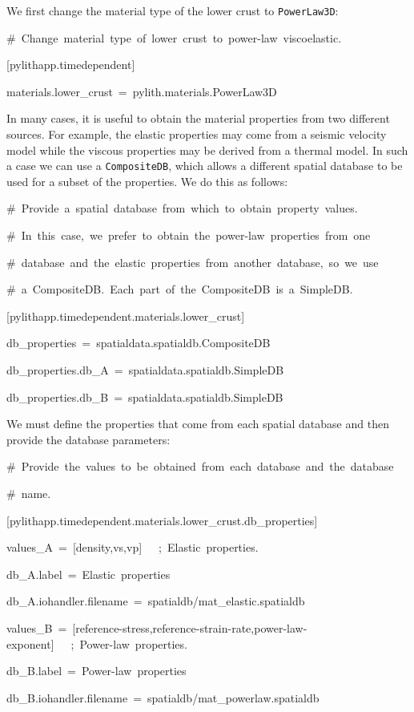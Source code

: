 We first change the material type of the lower crust to \texttt{PowerLaw3D}:
\begin{lyxcode}
\#~Change~material~type~of~lower~crust~to~power-law~viscoelastic.

{[}pylithapp.timedependent{]}

materials.lower\_crust~=~pylith.materials.PowerLaw3D
\end{lyxcode}
In many cases, it is useful to obtain the material properties from
two different sources. For example, the elastic properties may come
from a seismic velocity model while the viscous properties may be
derived from a thermal model. In such a case we can use a \texttt{CompositeDB},
which allows a different spatial database to be used for a subset
of the properties. We do this as follows:
\begin{lyxcode}
\#~Provide~a~spatial~database~from~which~to~obtain~property~values.

\#~In~this~case,~we~prefer~to~obtain~the~power-law~properties~from~one

\#~database~and~the~elastic~properties~from~another~database,~so~we~use

\#~a~CompositeDB.~Each~part~of~the~CompositeDB~is~a~SimpleDB.

{[}pylithapp.timedependent.materials.lower\_crust{]}

db\_properties~=~spatialdata.spatialdb.CompositeDB

db\_properties.db\_A~=~spatialdata.spatialdb.SimpleDB

db\_properties.db\_B~=~spatialdata.spatialdb.SimpleDB
\end{lyxcode}
We must define the properties that come from each spatial database
and then provide the database parameters:
\begin{lyxcode}
{\small{}\#~Provide~the~values~to~be~obtained~from~each~database~and~the~database}{\small \par}

{\small{}\#~name.}{\small \par}

{\small{}{[}pylithapp.timedependent.materials.lower\_crust.db\_properties{]}}{\small \par}

{\small{}values\_A~=~{[}density,vs,vp{]}~~~;~Elastic~properties.}{\small \par}

{\small{}db\_A.label~=~Elastic~properties}{\small \par}

{\small{}db\_A.iohandler.filename~=~spatialdb/mat\_elastic.spatialdb}{\small \par}

{\small{}values\_B~=~{[}reference-stress,reference-strain-rate,power-law-exponent{]}~~~;~Power-law~properties.}{\small \par}

{\small{}db\_B.label~=~Power-law~properties}{\small \par}

{\small{}db\_B.iohandler.filename~=~spatialdb/mat\_powerlaw.spatialdb}{\small \par}
\end{lyxcode}
